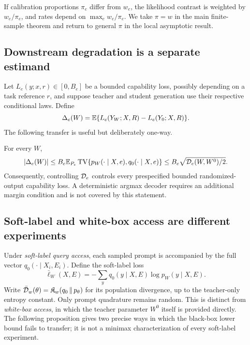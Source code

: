 If calibration proportions \(\pi_e\) differ from \(w_e\), the likelihood contrast is weighted by \(w_e/\pi_e\), and rates depend on \(\max_e w_e/\pi_e\). We take \(\pi=w\) in the main finite-sample theorem and return to general \(\pi\) in the local asymptotic result.

\subsection{Downstream degradation is a separate estimand}

Let \(L_e(y;x,r)\in[0,B_e]\) be a bounded capability loss, possibly depending on a task reference \(r\), and suppose teacher and student generation use their respective conditional laws. Define
\[
\Delta_e(W)=
\mathbb E\{L_e(Y_W;X,R)-L_e(Y_0;X,R)\}.
\]
The following transfer is useful but deliberately one-way.

\begin{proposition}
\label{prop:pinsker-transfer}
For every \(W\),
\[
 |\Delta_e(W)|
 \le B_e\mathbb E_{P_e}\operatorname{TV}\{p_W(\cdot\mid X,e),q_0(\cdot\mid X,e)\}
 \le B_e\sqrt{\mathcal D_e(W,W^0)/2}.
\]
Consequently, controlling \(\mathcal D_e\) controls every prespecified bounded randomized-output capability loss. A deterministic argmax decoder requires an additional margin condition and is not covered by this statement.
\end{proposition}

\subsection{Soft-label and white-box access are different experiments}

Under \emph{soft-label query access}, each sampled prompt is accompanied by
the full vector \(q_0(\cdot\mid X_i,E_i)\).  Define the soft-label loss
\[
 \bar\ell_W(X,E)=-\sum_y q_0(y\mid X,E)\log p_W(y\mid X,E).
\]
Write \(\bar{\mathcal D}_w(\theta)=\mathfrak K_w\!\left(q_0\,\middle\|\,p_\theta\right)\) for its population
divergence, up to the teacher-only entropy constant.
Only prompt quadrature remains random.  This is distinct from
\emph{white-box access}, in which the teacher parameter \(W^0\) itself is
provided directly. The following proposition gives two precise ways in which the
black-box lower bound fails to transfer; it is not a minimax characterization
of every soft-label experiment.

